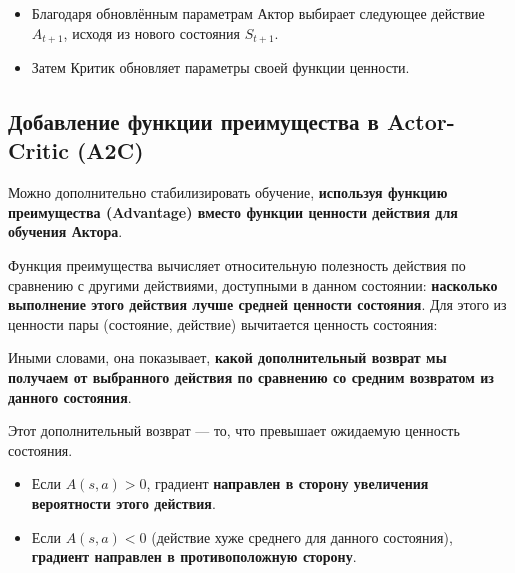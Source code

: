 \documentclass[11pt,a4paper]{article}
\begin{document}

\begin{itemize}
\item
  Благодаря обновлённым параметрам Актор выбирает следующее действие \(A_{t+1}\), исходя из нового состояния \(S_{t+1}\).
\item
  Затем Критик обновляет параметры своей функции ценности.
\end{itemize}


\subsection{Добавление функции преимущества в Actor-Critic (A2C)}\label{adding-advantage-in-actor-critic-a2c}

Можно дополнительно стабилизировать обучение, \textbf{используя функцию преимущества (Advantage) вместо функции ценности действия для обучения Актора}.

Функция преимущества вычисляет относительную полезность действия по сравнению с другими действиями, доступными в данном состоянии: \textbf{насколько выполнение этого действия лучше средней ценности состояния}. Для этого из ценности пары (состояние, действие) вычитается ценность состояния:


Иными словами, она показывает, \textbf{какой дополнительный возврат мы получаем от выбранного действия по сравнению со средним возвратом из данного состояния}.

Этот дополнительный возврат --- то, что превышает ожидаемую ценность состояния.

\begin{itemize}
\tightlist
\item
  Если \(A(s,a)>0\), градиент \textbf{направлен в сторону увеличения вероятности этого действия}.
\item
  Если \(A(s,a)<0\) (действие хуже среднего для данного состояния), \textbf{градиент направлен в противоположную сторону}.
\end{itemize}
\end{document}
